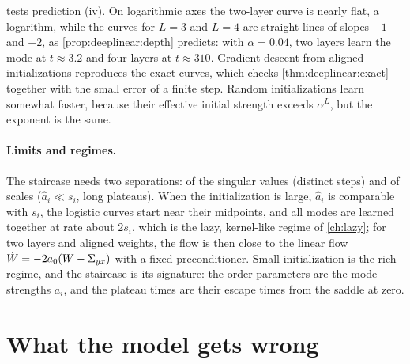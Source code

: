 \begin{refsection}
 tests prediction (iv). On logarithmic axes the two-layer curve is nearly flat, a logarithm, while the curves for $L=3$ and $L=4$ are straight lines of slopes $-1$ and $-2$, as \cref{prop:deeplinear:depth} predicts: with $\alpha=0.04$, two layers learn the mode at $t\approx3.2$ and four layers at $t\approx310$. Gradient descent from aligned initializations reproduces the exact curves, which checks \cref{thm:deeplinear:exact} together with the small error of a finite step. Random initializations learn somewhat faster, because their effective initial strength exceeds $\alpha^L$, but the exponent is the same.

\paragraph{Limits and regimes.} The staircase needs two separations: of the singular values (distinct steps) and of scales ($\hat a_i\ll s_i$, long plateaus). When the initialization is large, $\hat a_i$ is comparable with $s_i$, the logistic curves start near their midpoints, and all modes are learned together at rate about $2s_i$, which is the lazy, kernel-like regime of \cref{ch:lazy}; for two layers and aligned weights, the flow is then close to the linear flow $\dot W=-2a_0(W-\Sigma_{yx})$ with a fixed preconditioner. Small initialization is the rich regime, and the staircase is its signature: the order parameters are the mode strengths $a_i$, and the plateau times are their escape times from the saddle at zero.

\section{What the model gets wrong}\label{sec:deeplinear:wrong}


\end{refsection}
